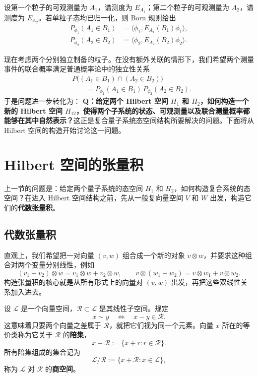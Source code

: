 \documentclass[UTF8,a4paper,11pt,openany]{ctexbook}
\begin{document}
设第一个粒子的可观测量为 $A_1$，谱测度为 $E_{A_1}$；第二个粒子的可观测量为 $A_2$，谱测度为 $E_{A_2}$。若单粒子态均已归一化，则 Born 规则给出
\begin{align}
    P_{\phi_1}(A_1\in B_1)
    &=
    \langle
        \phi_1,
        E_{A_1}(B_1)\phi_1
    \rangle,
    \nonumber\\
    P_{\phi_2}(A_2\in B_2)
    &=
    \langle
        \phi_2,
        E_{A_2}(B_2)\phi_2
    \rangle.
\end{align}

现在考虑两个分别独立制备的粒子。在没有额外关联的情形下，我们希望两个测量事件的联合概率满足普通概率论中的独立性关系
\begin{align}
    &
    P\bigl(
        (A_1\in B_1)
        \cap
        (A_2\in B_2)
    \bigr)
    \nonumber\\
    &\qquad=
    P_{\phi_1}(A_1\in B_1)\,
    P_{\phi_2}(A_2\in B_2).
\end{align}
于是问题进一步转化为：
\textbf{Q：给定两个 Hilbert 空间 $H_1$ 和 $H_2$，如何构造一个新的 Hilbert 空间 $H_{12}$，使得两个子系统的状态、可观测量以及联合测量概率都能够在其中自然表示？}这正是复合量子系统态空间结构所要解决的问题。下面将从 Hilbert 空间的构造开始讨论这一问题。

\section{Hilbert 空间的张量积}

上一节的问题是：给定两个量子系统的态空间 $H_1$ 和 $H_2$，如何构造复合系统的态空间？在进入 Hilbert 空间结构之前，先从一般复向量空间 $V$ 和 $W$ 出发，构造它们的\textbf{代数张量积}。

\subsection{代数张量积}

直观上，我们希望把一对向量 $(v,w)$ 组合成一个新的对象 $v\otimes w$，并要求这种组合对两个变量分别线性，例如
\[
(v_1+v_2)\otimes w
=
v_1\otimes w+v_2\otimes w,
\qquad
v\otimes(w_1+w_2)
=
v\otimes w_1+v\otimes w_2.
\]
构造张量积的核心就是从所有形式上的向量对 $(v,w)$ 出发，再把这些双线性关系加入进去。

\begin{definition}[商空间与陪集]
设 $\mathcal L$ 是一个向量空间，$\mathcal R\subset\mathcal L$ 是其线性子空间。规定
\[
x\sim y
\quad\Longleftrightarrow\quad
x-y\in\mathcal R.
\]
这意味着只要两个向量之差属于 $\mathcal R$，就把它们视为同一个元素。向量 $x$ 所在的等价类称为它关于 $\mathcal R$ 的\textbf{陪集}，
\begin{equation}
    x+\mathcal R
    :=
    \{x+r:r\in\mathcal R\}.
\end{equation}
所有陪集组成的集合记为
\begin{equation}
    \mathcal L/\mathcal R
    :=
    \{x+\mathcal R:x\in\mathcal L\},
\end{equation}
称为 $\mathcal L$ 对 $\mathcal R$ 的\textbf{商空间}。
\end{definition}
\end{document}
